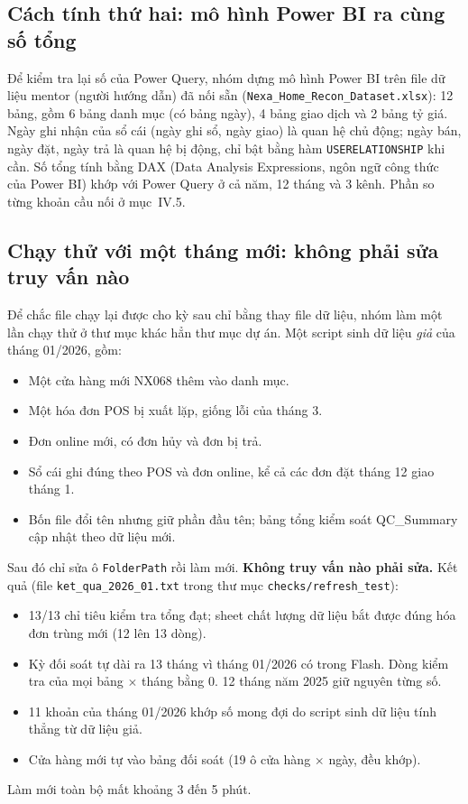 \label{tab:chatluong}\nopagebreak[4]


\subsection{Cách tính thứ hai: mô hình Power BI ra cùng số tổng}

Để kiểm tra lại số của Power Query, nhóm dựng mô hình Power BI trên file dữ liệu mentor (người hướng dẫn) đã nối sẵn (\texttt{Nexa\_Home\_Recon\_Dataset.xlsx}): 12 bảng, gồm 6 bảng danh mục (có bảng ngày), 4 bảng giao dịch và 2 bảng tỷ giá. Ngày ghi nhận của sổ cái (ngày ghi sổ, ngày giao) là quan hệ chủ động; ngày bán, ngày đặt, ngày trả là quan hệ bị động, chỉ bật bằng hàm \texttt{USERELATIONSHIP} khi cần. Số tổng tính bằng DAX (Data Analysis Expressions, ngôn ngữ công thức của Power BI) khớp với Power Query ở cả năm, 12 tháng và 3 kênh. Phần so từng khoản cầu nối ở mục~IV.5.

\subsection{Chạy thử với một tháng mới: không phải sửa truy vấn nào}

Để chắc file chạy lại được cho kỳ sau chỉ bằng thay file dữ liệu, nhóm làm một lần chạy thử ở thư mục khác hẳn thư mục dự án. Một script sinh dữ liệu \emph{giả} của tháng 01/2026, gồm:
\begin{itemize}
  \item Một cửa hàng mới NX068 thêm vào danh mục.
  \item Một hóa đơn POS bị xuất lặp, giống lỗi của tháng 3.
  \item Đơn online mới, có đơn hủy và đơn bị trả.
  \item Sổ cái ghi đúng theo POS và đơn online, kể cả các đơn đặt tháng 12 giao tháng 1.
  \item Bốn file đổi tên nhưng giữ phần đầu tên; bảng tổng kiểm soát QC\_Summary cập nhật theo dữ liệu mới.
\end{itemize}
Sau đó chỉ sửa ô \texttt{FolderPath} rồi làm mới. \textbf{Không truy vấn nào phải sửa.} Kết quả (file \texttt{ket\_qua\_2026\_01.txt} trong thư mục \texttt{checks/refresh\_test}):
\begin{itemize}
  \item 13/13 chỉ tiêu kiểm tra tổng đạt; sheet chất lượng dữ liệu bắt được đúng hóa đơn trùng mới (12 lên 13 dòng).
  \item Kỳ đối soát tự dài ra 13 tháng vì tháng 01/2026 có trong Flash. Dòng kiểm tra của mọi bảng $\times$ tháng bằng 0. 12 tháng năm 2025 giữ nguyên từng số.
  \item 11 khoản của tháng 01/2026 khớp số mong đợi do script sinh dữ liệu tính thẳng từ dữ liệu giả.
  \item Cửa hàng mới tự vào bảng đối soát (19 ô cửa hàng $\times$ ngày, đều khớp).
\end{itemize}
Làm mới toàn bộ mất khoảng 3 đến 5 phút.

